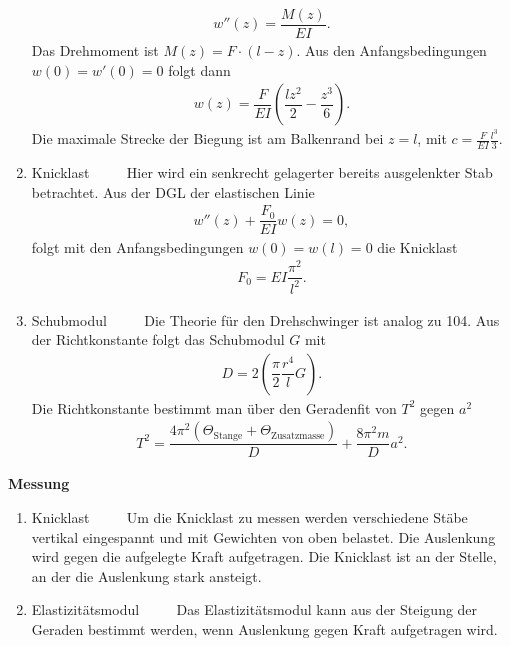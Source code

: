 \begin{enumerate}[label=--]
\begin{align}
                        w''\left(z\right)=\dfrac{M\left(z\right)}{EI}
                .\end{align} 
                Das Drehmoment ist $M\left(z\right)=F\cdot \left(l-z\right)$. 
                Aus den Anfangsbedingungen $w\left(0\right)=w'\left(0\right)=0$ folgt dann
                \begin{align} 
                        w\left(z\right)=\dfrac{F}{EI}\left(\dfrac{lz^2}{2}-\dfrac{z^3}{6}\right)
                .\end{align} 
                Die maximale Strecke der Biegung ist am Balkenrand bei $z=l$, mit $c=\tfrac{F}{EI}\tfrac{l^3}{3}$.
        \item Knicklast $\qquad $ 
                Hier wird ein senkrecht gelagerter bereits ausgelenkter Stab betrachtet.
                Aus der DGL der elastischen Linie
                \begin{align} 
                        w''\left(z\right)+\dfrac{F_0}{EI}w\left(z\right)=0
                ,\end{align} 
                folgt mit den Anfangsbedingungen $w\left(0\right)=w\left(l\right)=0$ die Knicklast
                \begin{align} 
                        F_0=EI\dfrac{\pi ^2}{l^2}
                .\end{align} 
        \item Schubmodul $\qquad $ 
                Die Theorie für den Drehschwinger ist analog zu 104.
                Aus der Richtkonstante folgt das Schubmodul $G$ mit
                \begin{align} 
                        D=2\left(\dfrac{\pi }{2}\dfrac{r^4}{l}G\right)
                .\end{align} 
                Die Richtkonstante bestimmt man über den Geradenfit von $T^2$ gegen $a^2$ 
                \begin{align} 
                        T^2=\dfrac{4\pi ^2\left(\Theta _{\text{Stange}}+\Theta _{\text{Zusatzmasse}}\right)}{D}+\dfrac{8\pi ^2m}{D}a^2
                .\end{align} 
\end{enumerate}
\textbf{Messung}
\begin{enumerate}[label=--]
        \item Knicklast $\qquad $ 
                Um die Knicklast zu messen werden verschiedene Stäbe vertikal eingespannt und mit Gewichten von oben belastet.
                Die Auslenkung wird gegen die aufgelegte Kraft aufgetragen. 
                Die Knicklast ist an der Stelle, an der die Auslenkung stark ansteigt.
        \item Elastizitätsmodul $\qquad $ 
                Das Elastizitätsmodul kann aus der Steigung der Geraden bestimmt werden, wenn Auslenkung gegen Kraft aufgetragen wird.
\end{enumerate}

